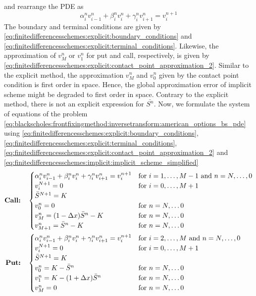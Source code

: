 and rearrange the PDE as
\begin{equation}
  \label{eq:finitedifferencesschemes:implicit:implicit_scheme_simplified}
  \alpha^{n}_{i}v^{n}_{i-1} + \beta^{n}_{i}v^{n}_{i} + \gamma^{n}_{i}v^{n}_{i+1} = v^{n+1}_{i}
\end{equation}
The boundary and terminal conditions are given by \eqref{eq:finitedifferencesschemes:explicit:boundary_conditions} and \eqref{eq:finitedifferencesschemes:explicit:terminal_conditions}. Likewise, the approximation of $v^{n}_{M}$ or $v^{n}_{1}$ for put and call, respectively, is given by \eqref{eq:finitedifferencesschemes:explicit:contact_point_approximation_2}. Similar to the explicit method, the approximation $v^{n}_{M}$ and $v^{n}_{0}$ given by the contact point condition is first order in space. Hence, the global approximation error of implicit scheme might be degraded to first order in space. Contrary to the explicit method, there is not an explicit expression for $\bar{S^n}$. Now, we formulate the system of equations of the problem \eqref{eq:blackscholes:frontfixingmethod:inversetransform:american_options_bs_pde}
using \eqref{eq:finitedifferencesschemes:explicit:boundary_conditions}, \eqref{eq:finitedifferencesschemes:explicit:terminal_conditions}, \eqref{eq:finitedifferencesschemes:explicit:contact_point_approximation_2} and \eqref{eq:finitedifferencesschemes:implicit:implicit_scheme_simplified}
\begin{subequations}
  \label{eq:finitedifferencesschemes:implicit:nielsen_system_of_equation}
  \begin{align}
    \text{\textbf{Call:}} \quad& \begin{cases}
      \alpha^{n}_{i}v^{n}_{i-1} + \beta^{n}_{i}v^{n}_{i} + \gamma^{n}_{i}v^{n}_{i+1} = v^{n+1}_{i} & \text{for $i = 1, \dots, M-1$ and $n = N,\dots,0$} \\
      v^{N+1}_i = 0 & \text{for $i = 0, \dots, M+1$}\\
      \bar{S}^{N+1} = K \\
      v^{n}_0 = 0 & \text{for $n = N, \dots 0$}\\
      v^{n}_{M} = (1-\Delta{x})\bar{S}^n - K & \text{for $n = N, \dots 0$}\\
      v^{n}_{M+1} = \bar{S}^n - K  & \text{for $n = N, \dots 0$}
    \end{cases}\\
    \text{\textbf{Put:}} \quad& \begin{cases}
      \alpha^{n}_{i}v^{n}_{i-1} + \beta^{n}_{i}v^{n}_{i} + \gamma^{n}_{i}v^{n}_{i+1} = v^{n+1}_{i} & \text{for $i = 2, \dots, M$ and $n = N,\dots,0$} \\
      v^{N+1}_i = 0 & \text{for $i = 0, \dots, M+1$} \\
      \bar{S}^{N+1} = K \\
      v^{n}_{0} = K - \bar{S}^{n} & \text{for $n = N, \dots 0$}\\
      v^{n}_{1} =  K - (1+\Delta{x})\bar{S}^{n} & \text{for $n = N, \dots 0$}\\
      v^{n}_{M} = 0 & \text{for $n = N, \dots 0$}
    \end{cases}
  \end{align}
\end{subequations}
